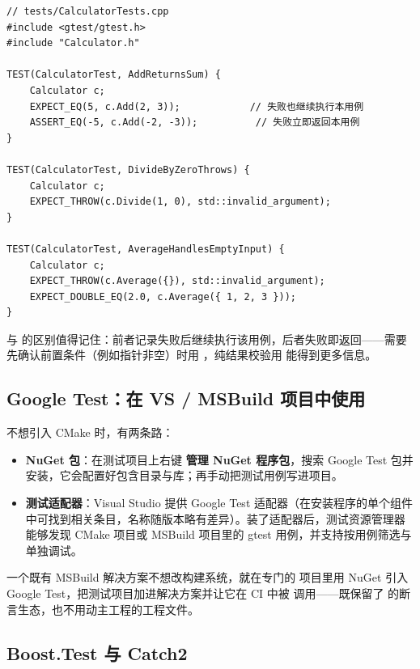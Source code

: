 \begin{lstlisting}[style=cppstyle]
// tests/CalculatorTests.cpp
#include <gtest/gtest.h>
#include "Calculator.h"

TEST(CalculatorTest, AddReturnsSum) {
    Calculator c;
    EXPECT_EQ(5, c.Add(2, 3));            // 失败也继续执行本用例
    ASSERT_EQ(-5, c.Add(-2, -3));          // 失败立即返回本用例
}

TEST(CalculatorTest, DivideByZeroThrows) {
    Calculator c;
    EXPECT_THROW(c.Divide(1, 0), std::invalid_argument);
}

TEST(CalculatorTest, AverageHandlesEmptyInput) {
    Calculator c;
    EXPECT_THROW(c.Average({}), std::invalid_argument);
    EXPECT_DOUBLE_EQ(2.0, c.Average({ 1, 2, 3 }));
}
\end{lstlisting}

 与  的区别值得记住：前者记录失败后继续执行该用例，后者失败即返回——需要先确认前置条件（例如指针非空）时用 ，纯结果校验用  能得到更多信息。

\subsection{Google Test：在 VS / MSBuild 项目中使用}

不想引入 CMake 时，有两条路：

\begin{itemize}
  \item \textbf{NuGet 包}：在测试项目上右键 \textbf{管理 NuGet 程序包}，搜索 Google Test 包并安装，它会配置好包含目录与库；再手动把测试用例写进项目。
  \item \textbf{测试适配器}：Visual Studio 提供 Google Test 适配器（在安装程序的单个组件中可找到相关条目，名称随版本略有差异）。装了适配器后，测试资源管理器能够发现 CMake 项目或 MSBuild 项目里的 gtest 用例，并支持按用例筛选与单独调试。
\end{itemize}

\begin{keybox}[实战场景]
一个既有 MSBuild 解决方案不想改构建系统，就在专门的  项目里用 NuGet 引入 Google Test，把测试项目加进解决方案并让它在 CI 中被  调用——既保留了  的断言生态，也不用动主工程的工程文件。
\end{keybox}

\subsection{Boost.Test 与 Catch2}

